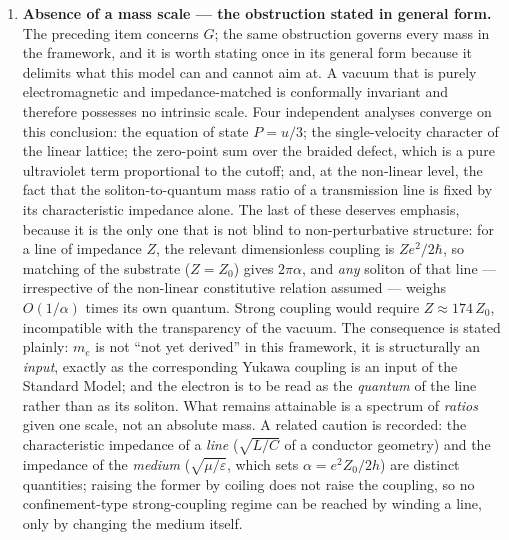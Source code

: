 \documentclass[11pt,a4paper]{article}
\theoremstyle{plain}
\theoremstyle{remark}
\begin{document}
\begin{enumerate}
    \item \textbf{Absence of a mass scale --- the obstruction stated in general form.} The preceding item concerns $G$; the same obstruction governs every mass in the framework, and it is worth stating once in its general form because it delimits what this model can and cannot aim at. A vacuum that is purely electromagnetic and impedance-matched is conformally invariant and therefore possesses no intrinsic scale. Four independent analyses converge on this conclusion: the equation of state $P = u/3$; the single-velocity character of the linear lattice; the zero-point sum over the braided defect, which is a pure ultraviolet term proportional to the cutoff; and, at the non-linear level, the fact that the soliton-to-quantum mass ratio of a transmission line is fixed by its characteristic impedance alone. The last of these deserves emphasis, because it is the only one that is not blind to non-perturbative structure: for a line of impedance $Z$, the relevant dimensionless coupling is $Z e^2/2\hbar$, so matching of the substrate ($Z = Z_0$) gives $2\pi\alpha$, and \emph{any} soliton of that line --- irrespective of the non-linear constitutive relation assumed --- weighs $O(1/\alpha)$ times its own quantum. Strong coupling would require $Z \approx 174\,Z_0$, incompatible with the transparency of the vacuum. The consequence is stated plainly: $m_e$ is not ``not yet derived'' in this framework, it is structurally an \emph{input}, exactly as the corresponding Yukawa coupling is an input of the Standard Model; and the electron is to be read as the \emph{quantum} of the line rather than as its soliton. What remains attainable is a spectrum of \emph{ratios} given one scale, not an absolute mass. A related caution is recorded: the characteristic impedance of a \emph{line} ($\sqrt{L/C}$ of a conductor geometry) and the impedance of the \emph{medium} ($\sqrt{\mu/\varepsilon}$, which sets $\alpha = e^2 Z_0/2h$) are distinct quantities; raising the former by coiling does not raise the coupling, so no confinement-type strong-coupling regime can be reached by winding a line, only by changing the medium itself.

\end{enumerate}
\end{document}
